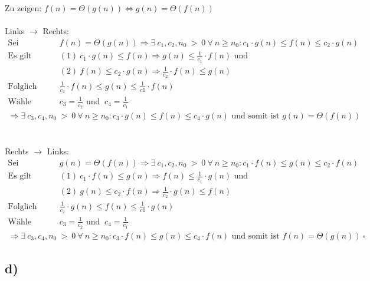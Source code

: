 \documentclass[a4paper]{scrartcl}
\begin{document}
Zu zeigen: $f(n) = \Theta(g(n)) \Longleftrightarrow g(n) = \Theta(f(n))$ \\ \\
Links $\rightarrow$ Rechts:
\begin{align*}
\text{Sei} &&& f(n) = \Theta(g(n)) \Rightarrow \exists ~ c_1 {,} c_2 {,} n_0 ~ {>} ~ 0 ~ \forall ~ n \geq n_0 : c_1 \cdot g(n) \leq f(n) \leq c_2 \cdot g(n) \\
\text{Es gilt } &&& (1) ~ c_1 \cdot g(n) \leq f(n) \Rightarrow g(n) \leq \frac{1}{c_1} \cdot f(n) \text{ und } \\
&&& (2) ~ f(n) \leq c_2 \cdot g(n) \Rightarrow \frac{1}{c_2} \cdot f(n) \leq g(n) \\
\text{Folglich } &&& \frac{1}{c_2} \cdot f(n) \leq g(n) \leq \frac{1}{c1} \cdot f(n) \\
\text{Wähle } &&& c_3 = \frac{1}{c_2} \text{ und } ~ c_4 = \frac{1}{c_1}
\end{align*} 
\begin{align*}
\Rightarrow \exists ~ c_3 {,} c_4 {,} n_0 ~ {>} ~ 0 ~ \forall ~ n \geq n_0 : c_3 \cdot g(n) \leq f(n) \leq c_4 \cdot g(n) \text{ und somit ist } g(n) = \Theta(f(n))
\end{align*} \\ \\
Rechts $\rightarrow$ Links:
\begin{align*}
\text{Sei} &&& g(n) = \Theta(f(n)) \Rightarrow \exists ~ c_1 {,} c_2 {,} n_0 ~ {>} ~ 0 ~ \forall ~ n \geq n_0 : c_1 \cdot f(n) \leq g(n) \leq c_2 \cdot f(n) \\
\text{Es gilt } &&& (1) ~ c_1 \cdot f(n) \leq g(n) \Rightarrow f(n) \leq \frac{1}{c_1} \cdot g(n) \text{ und } \\
&&& (2) ~ g(n) \leq c_2 \cdot f(n) \Rightarrow \frac{1}{c_2} \cdot g(n) \leq f(n) \\
\text{Folglich } &&& \frac{1}{c_2} \cdot g(n) \leq f(n) \leq \frac{1}{c1} \cdot g(n) \\
\text{Wähle } &&& c_3 = \frac{1}{c_2} \text{ und } ~ c_4 = \frac{1}{c_1} 
\end{align*} 
\begin{align*}
\Rightarrow \exists ~ c_3 {,} c_4 {,} n_0 ~ {>} ~ 0 ~ \forall ~ n \geq n_0 : c_3 \cdot f(n) \leq g(n) \leq c_4 \cdot f(n) \text{ und somit ist } f(n) = \Theta(g(n))  ~ \square
\end{align*}

\subsection*{d)}
\end{document}
